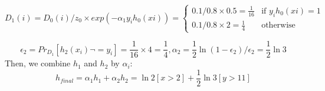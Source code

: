 \begin{equation*}
D_1(i) = D_0(i)/z_0 \times  exp(-\alpha_1 y_i h_0 (xi)) =
  \begin{cases}
    0.1/0.8 \times 0.5 = \frac{1}{16} & \mbox{if } y_i h_0 (xi) = 1 \\
    0.1/0.8 \times 2 = \frac{1}{4} & \mbox{otherwise}
  \end{cases}   
\end{equation*}
\item[(d)]
\begin{equation*}
\epsilon_2 =  Pr_{D_1}[h_2(x_i) \lnot= y_i] =\frac{1}{16}\times4= \frac{1}{4}, \alpha_2 = \frac{1}{2} \ln{(1-\epsilon_2)/\epsilon_2} = \frac{1}{2}\ln3
\end{equation*}
Then, we combine $h_1$ and $h_2$ by $\alpha_i$:
\begin{equation*}
h_{final} =  \alpha_1h_1+\alpha_2h_2 = \ln2[x > 2] +\frac{1}{2}\ln3[y > 11]
\end{equation*}





